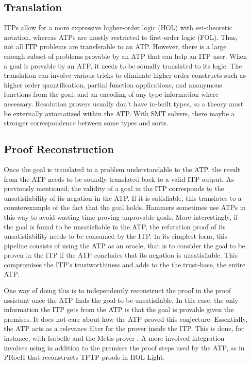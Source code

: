 \documentclass{article}
\begin{document}
		\subsection{Translation}
		ITPs allow for a more expressive higher-order logic
		(HOL) with set-theoretic notation, whereas ATPs 
		are mostly restricted to first-order logic (FOL). 
		Thus, not all 
		ITP problems are transferable to an ATP. However, 
		there is a large enough subset of problems provable
		by an ATP that can help an ITP user. When a goal is 
		provable by an ATP, it needs to be soundly translated 
		to its logic. The translation can involve various 
		tricks to eliminate higher-order constructs
		\cite{DBLP:journals/jar/MengP08} 
		such as higher order quantification, partial 
		function applications, and anonymous functions
		from the goal, and an encoding of any 
		type information where necessary. Resolution 
		provers usually don't have 
		in-built types, so a theory must be externally 
		axiomatized within the ATP. With SMT solvers, there
		maybe a stronger correspondence between some types and 
		sorts. 
	
		\subsection{Proof Reconstruction}
		Once the goal is translated to a problem understandable 
		to the ATP, the result from the ATP needs to be 
		soundly translated back to a valid ITP output.
		As previously mentioned, the validity of a goal in 
		the ITP corresponds to the unsatisfiability of its 
		negation in the ATP. If it is satisfiable, this 
		translates to a counterexample of the fact that 
		the goal holds. Hammers sometimes use ATPs 
		in this way to avoid wasting time proving 
		unprovable goals. More interestingly, if the 
		goal is found to be unsatisfiable in the ATP, 
		the refutation proof of its unsatisfiability
		needs to be consumed by the ITP. In its simplest form,
		this pipeline consists of using the ATP as an oracle, 
		that is to consider the goal to be proven in the 
		ITP if the ATP concludes that its negation is 
		unsatisfiable. This compromises the ITP's 
		trustworthiness and adds to the the trust-base, 
		the entire ATP.
		
		One way of doing this is to independently reconstruct 
		the proof in the proof assistant once the ATP finds 
		the goal to be unsatisfiable. In this case, the 
		only information the ITP gets from the ATP is that 
		the goal is provable given the premises. It does 
		not care about how the ATP proved this conjecture.
		Essentially, the ATP acts as a relevance filter for 
		the prover inside the ITP. This is done, for instance, 
		with Isabelle and the Metis prover 
		\cite{10.1007/978-3-540-74591-4_18}. A more involved
		integration involves using in addition to the premises
		the proof steps used by the ATP, as in PRocH
		\cite{10.1007/978-3-642-38574-2_18} that reconstructs 
		TPTP proofs in HOL Light.
		
\end{document}
